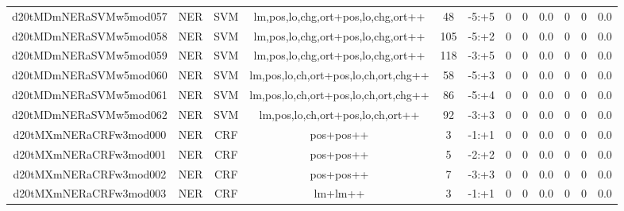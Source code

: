 \documentclass[a4paper]{article}
\begin{document}
\begin{landscape}
\begin{center}
\begin{tabular}{ |c|c|c|c|c|c|c|c|c|c|c|c|}
 
 	
 	\small{ d20tMDmNERaSVMw5mod057 } & \small{ NER} & \small{  SVM }  & lm,pos,lo,chg,ort+pos,lo,chg,ort++  &  48 &  \small{  -5:+5 }  &  0 & 0 & 0.0  &  0 & 0 & 0.0 \\
 	

 
 	
 	\small{ d20tMDmNERaSVMw5mod058 } & \small{ NER} & \small{  SVM }  & lm,pos,lo,chg,ort+pos,lo,chg,ort++  &  105 &  \small{  -5:+2 }  &  0 & 0 & 0.0  &  0 & 0 & 0.0 \\
 	

 
 	
 	\small{ d20tMDmNERaSVMw5mod059 } & \small{ NER} & \small{  SVM }  & lm,pos,lo,chg,ort+pos,lo,chg,ort++  &  118 &  \small{  -3:+5 }  &  0 & 0 & 0.0  &  0 & 0 & 0.0 \\
 	

 
 	
 	\small{ d20tMDmNERaSVMw5mod060 } & \small{ NER} & \small{  SVM }  & lm,pos,lo,ch,ort+pos,lo,ch,ort,chg++  &  58 &  \small{  -5:+3 }  &  0 & 0 & 0.0  &  0 & 0 & 0.0 \\
 	

 
 	
 	\small{ d20tMDmNERaSVMw5mod061 } & \small{ NER} & \small{  SVM }  & lm,pos,lo,ch,ort+pos,lo,ch,ort,chg++  &  86 &  \small{  -5:+4 }  &  0 & 0 & 0.0  &  0 & 0 & 0.0 \\
 	

 
 	
 	\small{ d20tMDmNERaSVMw5mod062 } & \small{ NER} & \small{  SVM }  & lm,pos,lo,ch,ort+pos,lo,ch,ort++  &  92 &  \small{  -3:+3 }  &  0 & 0 & 0.0  &  0 & 0 & 0.0 \\
 	

 
 	
 	\small{ d20tMXmNERaCRFw3mod000 } & \small{ NER} & \small{  CRF }  & pos+pos++  &  3 &  \small{  -1:+1 }  &  0 & 0 & 0.0  &  0 & 0 & 0.0 \\
 	

 
 	
 	\small{ d20tMXmNERaCRFw3mod001 } & \small{ NER} & \small{  CRF }  & pos+pos++  &  5 &  \small{  -2:+2 }  &  0 & 0 & 0.0  &  0 & 0 & 0.0 \\
 	

 
 	
 	\small{ d20tMXmNERaCRFw3mod002 } & \small{ NER} & \small{  CRF }  & pos+pos++  &  7 &  \small{  -3:+3 }  &  0 & 0 & 0.0  &  0 & 0 & 0.0 \\
 	

 
 	
 	\small{ d20tMXmNERaCRFw3mod003 } & \small{ NER} & \small{  CRF }  & lm+lm++  &  3 &  \small{  -1:+1 }  &  0 & 0 & 0.0  &  0 & 0 & 0.0 \\
 	

\end{tabular}
\end{center}
\end{landscape}
\end{document}
